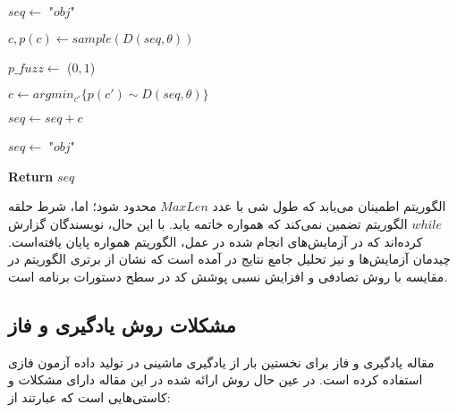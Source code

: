  
\begin{algorithm}[ht]
	\onehalfspacing
	\caption[]{ \cite{Godefroid:2017:LML:3155562.3155573}} \label{alg:sample_fuzz}
	\begin{latin}
		\DontPrintSemicolon
		\setcounter{AlgoLine}{0}
		\LinesNumbered
		
		
		
		
		\BlankLine
		
		$ seq \gets$ "$obj$"\;
		
		
		{
			$ c, p(c) \gets sample(D(seq,\theta)) $ \;
			
			$ p\_fuzz \gets $ \Rnd($0,1$) \;
			
			{
				$ c \gets argmin_{c'}\{ p(c') \sim D(seq, \theta) \} $ \;
			} 
			
			$ seq \gets seq + c$\;
			
			{
				$ seq \gets$ "$obj$" \;
			}
				
		}
		\textbf{Return}   $ seq $\;

	\end{latin}
\end{algorithm}

 
 الگوریتم  اطمینان می‌یابد که طول شی با عدد $ MaxLen $ محدود شود؛ اما، شرط حلقه $ while $ الگوریتم تضمین نمی‌کند که همواره خاتمه یابد. با این حال، نویسندگان گزارش کرده‌اند که در آزمایش‌های انجام شده در عمل، الگوریتم همواره پایان یافته‌است. چیدمان آزمایش‌ها و نیز تحلیل جامع نتایج در 
 \cite{Godefroid:2017:LML:3155562.3155573}
  آمده است که نشان از برتری الگوریتم  در مقایسه با روش تصادفی و افزایش نسبی پوشش کد در سطح دستورات برنامه است.
  
  
  
  \subsection{مشکلات روش یادگیری و فاز}
  مقاله یادگیری و فاز برای نخستین بار از یادگیری ماشینی در تولید داده آزمون فازی استفاده کرده ‌است. در عین حال روش ارائه شده در این مقاله دارای مشکلات و کاستی‌هایی است که عبارتند از:
  
